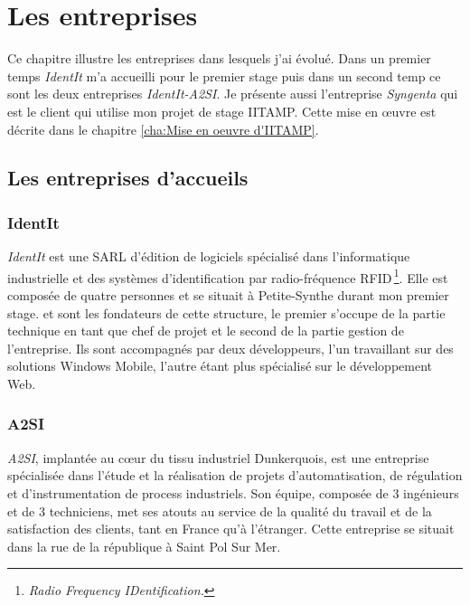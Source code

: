 \chapter{Les entreprises} %
\label{cha:Les entreprises}


\begin{it}

Ce chapitre illustre les entreprises dans lesquels j'ai évolué. Dans un
premier temps \emph{IdentIt} m'a accueilli pour le premier stage puis
dans un second temp ce sont les deux entreprises \emph{IdentIt-A2SI}. Je
présente aussi l'entreprise \emph{Syngenta} qui est le client qui
utilise mon projet de stage IITAMP. Cette mise en \oe{}uvre est décrite
dans le chapitre \ref{cha:Mise en oeuvre d'IITAMP}.

\end{it}

\section{Les entreprises d'accueils} %
\label{sec:Les entreprises d'accueils}

\subsection{IdentIt} %
\label{sub:IdentIt}

\emph{IdentIt} est une SARL d'édition de logiciels spécialisé dans
l'informatique industrielle et des systèmes d'identification par
radio-fréquence RFID\,\footnote{\emph{Radio Frequency IDentification.}}.
Elle est composée de quatre personnes et se situait à Petite-Synthe
durant mon premier stage.  et  sont les
fondateurs de cette structure, le premier s'occupe de la partie
technique en tant que chef de projet et le second de la partie gestion
de l'entreprise. Ils sont accompagnés par deux développeurs, l'un
travaillant sur des solutions Windows Mobile, l'autre étant plus
spécialisé sur le développement Web.


\subsection{A2SI} %
\label{sub:A2SI}

\emph{A2SI}, implantée au c\oe{}ur du tissu industriel Dunkerquois, est une
entreprise spécialisée dans l’étude et la réalisation de projets
d’automatisation, de régulation et d’instrumentation de process
industriels. Son équipe, composée de 3 ingénieurs et de 3
techniciens, met ses atouts au service de la qualité du travail et de la
satisfaction des clients, tant en France qu’à l’étranger. Cette
entreprise se situait dans la rue de la république à Saint Pol Sur Mer.

